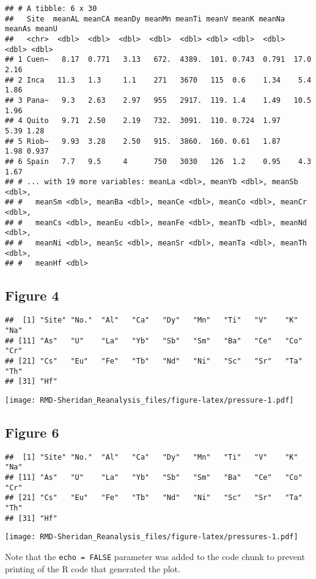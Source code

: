 \documentclass[]{article}
\begin{document}
\begin{verbatim}
## # A tibble: 6 x 30
##   Site  meanAL meanCA meanDy meanMn meanTi meanV meanK meanNa meanAs meanU
##   <chr>  <dbl>  <dbl>  <dbl>  <dbl>  <dbl> <dbl> <dbl>  <dbl>  <dbl> <dbl>
## 1 Cuen~   8.17  0.771   3.13   672.  4389.  101. 0.743  0.791  17.0  2.16 
## 2 Inca   11.3   1.3     1.1    271   3670   115  0.6    1.34    5.4  1.86 
## 3 Pana~   9.3   2.63    2.97   955   2917.  119. 1.4    1.49   10.5  1.96 
## 4 Quito   9.71  2.50    2.19   732.  3091.  110. 0.724  1.97    5.39 1.28 
## 5 Riob~   9.93  3.28    2.50   915.  3860.  160. 0.61   1.87    1.98 0.937
## 6 Spain   7.7   9.5     4      750   3030   126  1.2    0.95    4.3  1.67 
## # ... with 19 more variables: meanLa <dbl>, meanYb <dbl>, meanSb <dbl>,
## #   meanSm <dbl>, meanBa <dbl>, meanCe <dbl>, meanCo <dbl>, meanCr <dbl>,
## #   meanCs <dbl>, meanEu <dbl>, meanFe <dbl>, meanTb <dbl>, meanNd <dbl>,
## #   meanNi <dbl>, meanSc <dbl>, meanSr <dbl>, meanTa <dbl>, meanTh <dbl>,
## #   meanHf <dbl>
\end{verbatim}

\hypertarget{figure-4}{%
\subsection{Figure 4}\label{figure-4}}

\begin{verbatim}
##  [1] "Site" "No."  "Al"   "Ca"   "Dy"   "Mn"   "Ti"   "V"    "K"    "Na"  
## [11] "As"   "U"    "La"   "Yb"   "Sb"   "Sm"   "Ba"   "Ce"   "Co"   "Cr"  
## [21] "Cs"   "Eu"   "Fe"   "Tb"   "Nd"   "Ni"   "Sc"   "Sr"   "Ta"   "Th"  
## [31] "Hf"
\end{verbatim}

\texttt{[image: RMD-Sheridan\_Reanalysis\_files/figure-latex/pressure-1.pdf]}

\hypertarget{figure-6}{%
\subsection{Figure 6}\label{figure-6}}

\begin{verbatim}
##  [1] "Site" "No."  "Al"   "Ca"   "Dy"   "Mn"   "Ti"   "V"    "K"    "Na"  
## [11] "As"   "U"    "La"   "Yb"   "Sb"   "Sm"   "Ba"   "Ce"   "Co"   "Cr"  
## [21] "Cs"   "Eu"   "Fe"   "Tb"   "Nd"   "Ni"   "Sc"   "Sr"   "Ta"   "Th"  
## [31] "Hf"
\end{verbatim}

\texttt{[image: RMD-Sheridan\_Reanalysis\_files/figure-latex/pressures-1.pdf]}

Note that the \texttt{echo\ =\ FALSE} parameter was added to the code
chunk to prevent printing of the R code that generated the plot.
\end{document}
